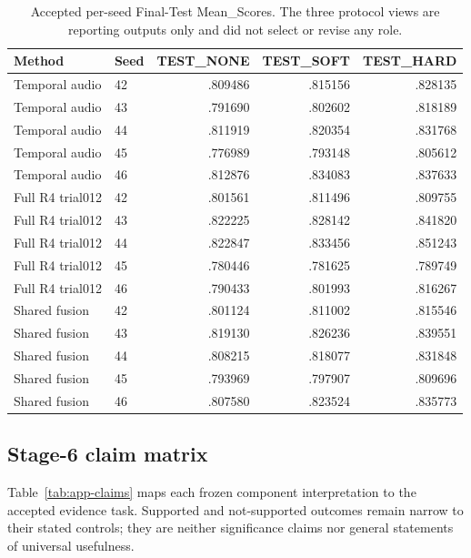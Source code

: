 \begin{table}[t]
\centering\scriptsize
\caption{Accepted per-seed Final-Test Mean\_Scores. The three protocol views are reporting outputs only and did not select or revise any role.}
\label{tab:app-test-seeds}
\begin{tabular}{llrrr}
\toprule
Method & Seed & TEST\_NONE & TEST\_SOFT & TEST\_HARD\\
\midrule
Temporal audio & 42 & .809486 & .815156 & .828135\\
Temporal audio & 43 & .791690 & .802602 & .818189\\
Temporal audio & 44 & .811919 & .820354 & .831768\\
Temporal audio & 45 & .776989 & .793148 & .805612\\
Temporal audio & 46 & .812876 & .834083 & .837633\\
\addlinespace
Full R4 trial012 & 42 & .801561 & .811496 & .809755\\
Full R4 trial012 & 43 & .822225 & .828142 & .841820\\
Full R4 trial012 & 44 & .822847 & .833456 & .851243\\
Full R4 trial012 & 45 & .780446 & .781625 & .789749\\
Full R4 trial012 & 46 & .790433 & .801993 & .816267\\
\addlinespace
Shared fusion & 42 & .801124 & .811002 & .815546\\
Shared fusion & 43 & .819130 & .826236 & .839551\\
Shared fusion & 44 & .808215 & .818077 & .831848\\
Shared fusion & 45 & .793969 & .797907 & .809696\\
Shared fusion & 46 & .807580 & .823524 & .835773\\
\bottomrule
\end{tabular}
\end{table}

\subsection{Stage-6 claim matrix}

Table~\ref{tab:app-claims} maps each frozen component interpretation to the accepted evidence task. Supported and not-supported outcomes remain narrow to their stated controls; they are neither significance claims nor general statements of universal usefulness.

